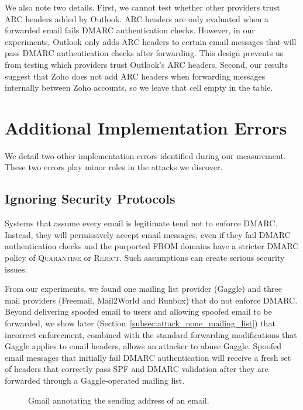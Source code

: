 We also note two details.
First, we cannot test whether other providers trust ARC headers added by Outlook. ARC headers are only evaluated when a forwarded email fails DMARC authentication checks.
However, in our experiments, Outlook only adds ARC headers to certain email messages that will pass DMARC authentication checks after forwarding.
This design prevents us from testing which providers trust Outlook's ARC headers.
Second, our results suggest that Zoho does not add ARC headers when forwarding messages internally between Zoho accounts, so we leave that cell empty in the table.

\section{Additional Implementation Errors}
\label{sec:implementation_errors_additional}
We detail two other implementation errors identified during our measurement. These two errors play minor roles in the attacks we discover.
\subsection{Ignoring Security Protocols}
\label{subsec:no_dmarc}
Systems that assume every email is legitimate tend not to enforce DMARC. Instead, they will permissively accept
email messages, even if they fail DMARC authentication checks and the
purported FROM domains have a stricter DMARC policy of \textsc{Quarantine} or
\textsc{Reject}. Such assumptions can create serious security issues.

From our experiments, we found
one mailing list provider (Gaggle) and three mail providers (Freemail, Mail2World and Runbox) that do not enforce
DMARC.
Beyond delivering spoofed email to users and allowing spoofed email to be forwarded, we
show later (Section~\ref{subsec:attack_none_mailing_list}) that
incorrect enforcement, combined with the standard forwarding
modifications that Gaggle applies to email headers, allows an attacker
to abuse Gaggle. Spoofed email messages that initially fail
DMARC authentication will receive a fresh set of headers that
correctly pass SPF and DMARC validation after they are forwarded
through a Gaggle-operated mailing list.

\begin{figure}[t]
  \centering
{
    \setlength{\fboxsep}{0pt}
    \setlength{\fboxrule}{0.5pt}
}
  \caption{Gmail annotating the sending address of an email. 
}
\label{fig:gmail_via}
\end{figure}

